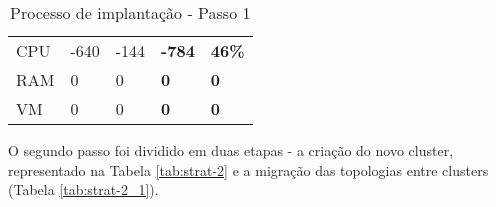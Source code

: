 \begin{table}[H]
\begin{tabular}{|l|l|l|l|l|}
    \cellcolor[HTML]{C0C0C0}CPU                             & -640                                                    & -144                                                    & \textbf{-784} & \textbf{46\%} \\ \cline{1-5}
    \cellcolor[HTML]{C0C0C0}RAM                             & 0                                                       & 0                                                       & \textbf{0}    & \textbf{0}    \\ \cline{1-5}
    \cellcolor[HTML]{C0C0C0}VM                              & 0                                                       & 0                                                       & \textbf{0}    & \textbf{0}    \\ \cline{1-5}
  \end{tabular}
  
  \caption{Processo de implantação - Passo 1}
  \label{tab:strat-1}
\end{table}

O segundo passo foi dividido em duas etapas - a criação do novo \gls{cluster}, representado na 
Tabela \ref{tab:strat-2} e a migração das topologias entre \glspl{cluster} (Tabela 
\ref{tab:strat-2_1}).

